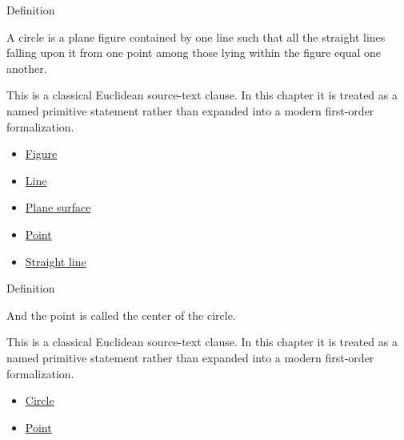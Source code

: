 \begin{definitionbox}{Definition}
\begin{definition}[Circle]
\label{def:euclid-circle}
A circle is a plane figure contained by one line such that all the straight
lines falling upon it from one point among those lying within the figure equal
one another.
\end{definition}
\end{definitionbox}
\begin{remark*}
This is a classical Euclidean source-text clause. In this chapter it is treated
as a named primitive statement rather than expanded into a modern first-order
formalization.
\end{remark*}

\begin{lra-not-visible}
\begin{dependencies}
\begin{itemize}
  \item \hyperref[def:euclid-figure]{Figure}
  \item \hyperref[def:euclid-line]{Line}
  \item \hyperref[def:euclid-plane-surface]{Plane surface}
  \item \hyperref[def:euclid-point]{Point}
  \item \hyperref[def:euclid-straight-line]{Straight line}
\end{itemize}
\end{dependencies}
\end{lra-not-visible}

\begin{definitionbox}{Definition}
\begin{definition}
\label{def:euclid-center-of-a-circle}
And the point is called the center of the circle.
\end{definition}
\end{definitionbox}
\begin{remark*}
This is a classical Euclidean source-text clause. In this chapter it is treated
as a named primitive statement rather than expanded into a modern first-order
formalization.
\end{remark*}

\begin{lra-not-visible}
\begin{dependencies}
\begin{itemize}
  \item \hyperref[def:euclid-circle]{Circle}
  \item \hyperref[def:euclid-point]{Point}
\end{itemize}
\end{dependencies}
\end{lra-not-visible}

